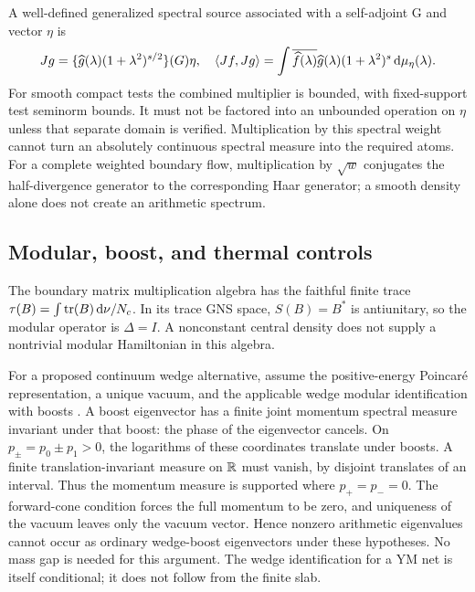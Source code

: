 A well-defined generalized spectral source associated
with a self-adjoint G and vector $\eta$ is
\begin{equation}
Jg=\{\widehat g(\lambda)(1+\lambda^2)^{s/2}\}(G)\eta,
\quad
\langle Jf,Jg\rangle=
\int\overline{\widehat f(\lambda)}\widehat g(\lambda)
                    (1+\lambda^2)^s\,\mathrm d\mu_\eta(\lambda).
\end{equation}
For smooth compact tests the combined multiplier is
bounded, with fixed-support test seminorm bounds.
It must not be factored into an unbounded operation
on $\eta$ unless that separate domain is verified.
Multiplication by this spectral weight cannot turn
an absolutely continuous spectral measure into
the required atoms.
For a complete weighted boundary flow, multiplication
by $\sqrt w$ conjugates the half-divergence generator
to the corresponding Haar generator; a smooth density
alone does not create an arithmetic spectrum.

\subsection{Modular, boost, and thermal controls}
The boundary matrix multiplication algebra has the
faithful finite trace $\tau(B)=\int\operatorname{tr}(B)\,\mathrm d\nu/N_c$.
In its trace GNS space, $S(B)=B^*$ is antiunitary,
so the modular operator is $\Delta=I$. A nonconstant
central density does not supply a nontrivial modular
Hamiltonian in this algebra.

For a proposed continuum wedge alternative, assume
the positive-energy Poincar\'e representation, a
unique vacuum, and the applicable wedge modular
identification with boosts \cite{bw}. A boost
eigenvector has a finite joint momentum spectral
measure invariant under that boost: the phase of
the eigenvector cancels. On $p_\pm=p_0\pm p_1>0$,
the logarithms of these coordinates translate under
boosts. A finite translation-invariant measure on
$\mathbb R$ must vanish, by disjoint translates of an
interval. Thus the momentum measure is supported
where $p_+=p_-=0$. The forward-cone condition forces
the full momentum to be zero, and uniqueness of
the vacuum leaves only the vacuum vector.
Hence nonzero arithmetic eigenvalues cannot occur
as ordinary wedge-boost eigenvectors under these
hypotheses. No mass gap is needed for this argument.
The wedge identification for a YM net is itself
conditional; it does not follow from the finite slab.

